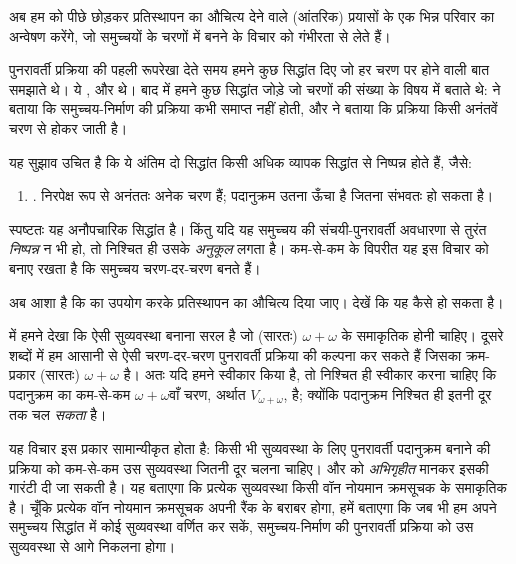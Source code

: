 \documentclass[../../../include/open-logic-section]{subfiles}
\begin{document}

अब हम \limofsize{} को पीछे छोड़कर प्रतिस्थापन का औचित्य देने वाले (आंतरिक)
प्रयासों के एक भिन्न परिवार का अन्वेषण करेंगे, जो समुच्चयों के चरणों में बनने
के विचार को गंभीरता से लेते हैं।

पुनरावर्ती प्रक्रिया की पहली रूपरेखा देते समय हमने कुछ सिद्धांत दिए जो हर
चरण पर होने वाली बात समझाते थे। ये \stageshier, \stagesord और \stagesacc
थे। बाद में हमने कुछ सिद्धांत जोड़े जो चरणों की संख्या के विषय में बताते थे:
\stagessucc{} ने बताया कि समुच्चय-निर्माण की प्रक्रिया कभी समाप्त नहीं होती,
और \stagesinf{} ने बताया कि प्रक्रिया किसी अनंतवें चरण से होकर जाती है।

यह सुझाव उचित है कि ये अंतिम दो सिद्धांत किसी अधिक व्यापक सिद्धांत से
निष्पन्न होते हैं, जैसे:
\begin{enumerate}
	\item[] \stagesinex. निरपेक्ष रूप से अनंततः अनेक चरण हैं; पदानुक्रम
	उतना ऊँचा है जितना संभवतः हो सकता है।
\end{enumerate}
स्पष्टतः यह अनौपचारिक सिद्धांत है। किंतु यदि यह समुच्चय की संचयी-पुनरावर्ती
अवधारणा से तुरंत \emph{निष्पन्न} न भी हो, तो निश्चित ही उसके \emph{अनुकूल}
लगता है। कम-से-कम \limofsize{} के विपरीत यह इस विचार को बनाए रखता है कि
समुच्चय चरण-दर-चरण बनते हैं।

अब आशा है कि \stagesinex{} का उपयोग करके प्रतिस्थापन का औचित्य दिया जाए।
देखें कि यह कैसे हो सकता है।

 में हमने देखा कि ऐसी सुव्यवस्था बनाना सरल है जो
(सारतः) $\omega+\omega$ के समाकृतिक होनी चाहिए। दूसरे शब्दों में हम आसानी
से ऐसी चरण-दर-चरण पुनरावर्ती प्रक्रिया की कल्पना कर सकते हैं जिसका
क्रम-प्रकार (सारतः) $\omega+\omega$ है। अतः यदि हमने \stagesinex{} स्वीकार
किया है, तो निश्चित ही स्वीकार करना चाहिए कि पदानुक्रम का कम-से-कम
$\omega+\omega$वाँ चरण, अर्थात $V_{\omega+\omega}$, है; क्योंकि पदानुक्रम
निश्चित ही इतनी दूर तक चल \emph{सकता} है।

यह विचार इस प्रकार सामान्यीकृत होता है: किसी भी सुव्यवस्था के लिए
पुनरावर्ती पदानुक्रम बनाने की प्रक्रिया को कम-से-कम उस सुव्यवस्था जितनी दूर
चलना चाहिए। और  को
\emph{अभिगृहीत} मानकर इसकी गारंटी दी जा सकती है। यह बताएगा कि प्रत्येक
सुव्यवस्था किसी वॉन नोयमान क्रमसूचक के समाकृतिक है। चूँकि प्रत्येक वॉन
नोयमान क्रमसूचक अपनी रैंक के बराबर होगा,
 हमें बताएगा कि जब भी हम
अपने समुच्चय सिद्धांत में कोई सुव्यवस्था वर्णित कर सकें, समुच्चय-निर्माण की
पुनरावर्ती प्रक्रिया को उस सुव्यवस्था से आगे निकलना होगा।
\end{document}
